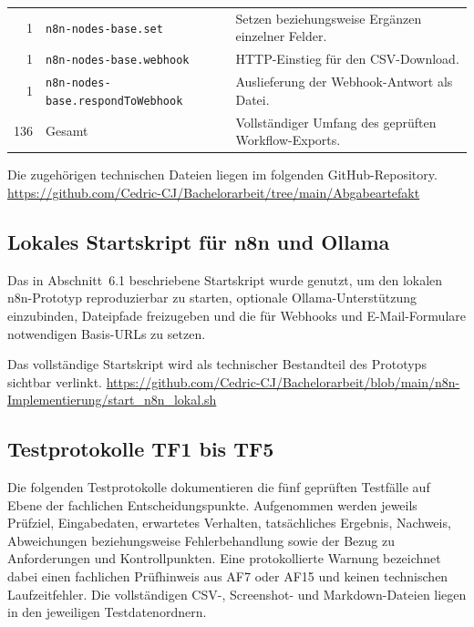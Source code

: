 \documentclass[a4paper,12pt]{article}
\begin{document}
\begin{table}[H]
\begin{tabularx}{\textwidth}{@{}rp{5.4cm}X@{}}
        1 & \texttt{n8n-nodes-base.set} & Setzen beziehungsweise Ergänzen einzelner Felder. \\
        1 & \texttt{n8n-nodes-base.webhook} & HTTP-Einstieg für den CSV-Download. \\
        1 & \texttt{n8n-nodes-base.}\newline\texttt{respondToWebhook} & Auslieferung der Webhook-Antwort als Datei. \\
        \midrule
        136 & Gesamt & Vollständiger Umfang des geprüften Workflow-Exports. \\
        \bottomrule
    \end{tabularx}
\end{table}

Die zugehörigen technischen Dateien liegen im folgenden GitHub-Repository.
\url{https://github.com/Cedric-CJ/Bachelorarbeit/tree/main/Abgabeartefakt}

\clearpage
\subsection{Lokales Startskript für n8n und Ollama}
\label{anhang:startskript}
Das in Abschnitt~6.1 beschriebene Startskript wurde genutzt, um den lokalen n8n-Prototyp reproduzierbar zu starten, optionale Ollama-Unterstützung einzubinden, Dateipfade freizugeben und die für Webhooks und E-Mail-Formulare notwendigen Basis-URLs zu setzen.

Das vollständige Startskript wird als technischer Bestandteil des Prototyps sichtbar verlinkt.
\url{https://github.com/Cedric-CJ/Bachelorarbeit/blob/main/n8n-Implementierung/start_n8n_lokal.sh}

\clearpage
\subsection{Testprotokolle TF1 bis TF5}
\label{anhang:testprotokolle}
\begingroup
\small
\sloppy
Die folgenden Testprotokolle dokumentieren die fünf geprüften Testfälle auf Ebene der fachlichen Entscheidungspunkte. Aufgenommen werden jeweils Prüfziel, Eingabedaten, erwartetes Verhalten, tatsächliches Ergebnis, Nachweis, Abweichungen beziehungsweise Fehlerbehandlung sowie der Bezug zu Anforderungen und Kontrollpunkten. Eine protokollierte Warnung bezeichnet dabei einen fachlichen Prüfhinweis aus AF7 oder AF15 und keinen technischen Laufzeitfehler. Die vollständigen CSV-, Screenshot- und Markdown-Dateien liegen in den jeweiligen Testdatenordnern.
\end{document}
